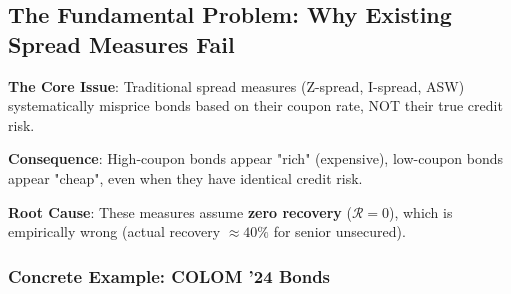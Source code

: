 \documentclass[11pt,a4paper]{article}
\begin{document}
\subsection{The Fundamental Problem: Why Existing Spread Measures Fail}

\begin{warnbox}
\textbf{The Core Issue}: Traditional spread measures (Z-spread, I-spread, ASW) systematically misprice bonds based on their coupon rate, NOT their true credit risk.

\textbf{Consequence}: High-coupon bonds appear "rich" (expensive), low-coupon bonds appear "cheap", even when they have identical credit risk.

\textbf{Root Cause}: These measures assume \textbf{zero recovery} ($\mathcal{R}=0$), which is empirically wrong (actual recovery $\approx 40\%$ for senior unsecured).
\end{warnbox}

\subsubsection{Concrete Example: COLOM '24 Bonds}
\end{document}
